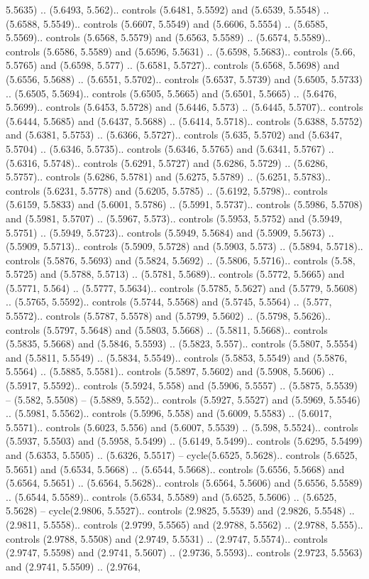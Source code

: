 5.5635) .. (5.6493, 5.562).. controls (5.6481, 5.5592) and (5.6539, 5.5548) .. (5.6588, 5.5549).. controls (5.6607, 5.5549) and (5.6606, 5.5554) .. (5.6585, 5.5569).. controls (5.6568, 5.5579) and (5.6563, 5.5589) .. (5.6574, 5.5589).. controls (5.6586, 5.5589) and (5.6596, 5.5631) .. (5.6598, 5.5683).. controls (5.66, 5.5765) and (5.6598, 5.577) .. (5.6581, 5.5727).. controls (5.6568, 5.5698) and (5.6556, 5.5688) .. (5.6551, 5.5702).. controls (5.6537, 5.5739) and (5.6505, 5.5733) .. (5.6505, 5.5694).. controls (5.6505, 5.5665) and (5.6501, 5.5665) .. (5.6476, 5.5699).. controls (5.6453, 5.5728) and (5.6446, 5.573) .. (5.6445, 5.5707).. controls (5.6444, 5.5685) and (5.6437, 5.5688) .. (5.6414, 5.5718).. controls (5.6388, 5.5752) and (5.6381, 5.5753) .. (5.6366, 5.5727).. controls (5.635, 5.5702) and (5.6347, 5.5704) .. (5.6346, 5.5735).. controls (5.6346, 5.5765) and (5.6341, 5.5767) .. (5.6316, 5.5748).. controls (5.6291, 5.5727) and (5.6286, 5.5729) .. (5.6286, 5.5757).. controls (5.6286, 5.5781) and (5.6275, 5.5789) .. (5.6251, 5.5783).. controls (5.6231, 5.5778) and (5.6205, 5.5785) .. (5.6192, 5.5798).. controls (5.6159, 5.5833) and (5.6001, 5.5786) .. (5.5991, 5.5737).. controls (5.5986, 5.5708) and (5.5981, 5.5707) .. (5.5967, 5.573).. controls (5.5953, 5.5752) and (5.5949, 5.5751) .. (5.5949, 5.5723).. controls (5.5949, 5.5684) and (5.5909, 5.5673) .. (5.5909, 5.5713).. controls (5.5909, 5.5728) and (5.5903, 5.573) .. (5.5894, 5.5718).. controls (5.5876, 5.5693) and (5.5824, 5.5692) .. (5.5806, 5.5716).. controls (5.58, 5.5725) and (5.5788, 5.5713) .. (5.5781, 5.5689).. controls (5.5772, 5.5665) and (5.5771, 5.564) .. (5.5777, 5.5634).. controls (5.5785, 5.5627) and (5.5779, 5.5608) .. (5.5765, 5.5592).. controls (5.5744, 5.5568) and (5.5745, 5.5564) .. (5.577, 5.5572).. controls (5.5787, 5.5578) and (5.5799, 5.5602) .. (5.5798, 5.5626).. controls (5.5797, 5.5648) and (5.5803, 5.5668) .. (5.5811, 5.5668).. controls (5.5835, 5.5668) and (5.5846, 5.5593) .. (5.5823, 5.557).. controls (5.5807, 5.5554) and (5.5811, 5.5549) .. (5.5834, 5.5549).. controls (5.5853, 5.5549) and (5.5876, 5.5564) .. (5.5885, 5.5581).. controls (5.5897, 5.5602) and (5.5908, 5.5606) .. (5.5917, 5.5592).. controls (5.5924, 5.558) and (5.5906, 5.5557) .. (5.5875, 5.5539) -- (5.582, 5.5508) -- (5.5889, 5.552).. controls (5.5927, 5.5527) and (5.5969, 5.5546) .. (5.5981, 5.5562).. controls (5.5996, 5.558) and (5.6009, 5.5583) .. (5.6017, 5.5571).. controls (5.6023, 5.556) and (5.6007, 5.5539) .. (5.598, 5.5524).. controls (5.5937, 5.5503) and (5.5958, 5.5499) .. (5.6149, 5.5499).. controls (5.6295, 5.5499) and (5.6353, 5.5505) .. (5.6326, 5.5517) -- cycle(5.6525, 5.5628).. controls (5.6525, 5.5651) and (5.6534, 5.5668) .. (5.6544, 5.5668).. controls (5.6556, 5.5668) and (5.6564, 5.5651) .. (5.6564, 5.5628).. controls (5.6564, 5.5606) and (5.6556, 5.5589) .. (5.6544, 5.5589).. controls (5.6534, 5.5589) and (5.6525, 5.5606) .. (5.6525, 5.5628) -- cycle(2.9806, 5.5527).. controls (2.9825, 5.5539) and (2.9826, 5.5548) .. (2.9811, 5.5558).. controls (2.9799, 5.5565) and (2.9788, 5.5562) .. (2.9788, 5.555).. controls (2.9788, 5.5508) and (2.9749, 5.5531) .. (2.9747, 5.5574).. controls (2.9747, 5.5598) and (2.9741, 5.5607) .. (2.9736, 5.5593).. controls (2.9723, 5.5563) and (2.9741, 5.5509) .. (2.9764, 